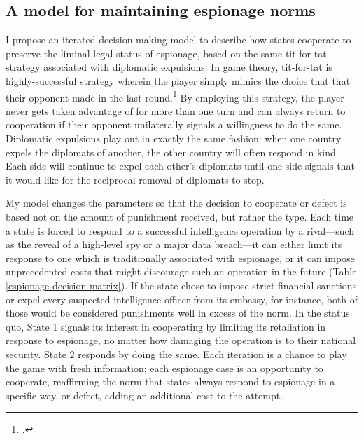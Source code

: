 \documentclass[14pt]{extarticle}
\begin{document}
\subsection{A model for maintaining espionage norms}
I propose an iterated decision-making model to describe how states cooperate to preserve the liminal legal status of espionage, based on the same tit-for-tat strategy associated with diplomatic expulsions. In game theory, tit-for-tat is highly-successful strategy wherein the player simply mimics the choice that that their opponent made in the last round.\footcite[p.~8]{axelrod_effective_1980} By employing this strategy, the player never gets taken advantage of for more than one turn and can always return to cooperation if their opponent unilaterally signals a willingness to do the same. Diplomatic expulsions play out in exactly the same fashion: when one country expels the diplomats of another, the other country will often respond in kind. Each side will continue to expel each other's diplomats until one side signals that it would like for the reciprocal removal of diplomats to stop.


My model changes the parameters so that the decision to cooperate or defect is based not on the amount of punishment received, but rather the type. Each time a state is forced to respond to a successful intelligence operation by a rival---such as the reveal of a high-level spy or a major data breach---it can either limit its response to one which is traditionally associated with espionage, or it can impose unprecedented costs that might discourage such an operation in the future (Table \ref{espionage-decision-matrix}). If the state chose to impose strict financial sanctions or expel every suspected intelligence officer from its embassy, for instance, both of those would be considered punishments well in excess of the norm. In the status quo, State 1 signals its interest in cooperating by limiting its retaliation in response to espionage, no matter how damaging the operation is to their national security. State 2 responds by doing the same. Each iteration is a chance to play the game with fresh information; each espionage case is an opportunity to cooperate, reaffirming the norm that states always respond to espionage in a specific way, or defect, adding an additional cost to the attempt.
\end{document}
